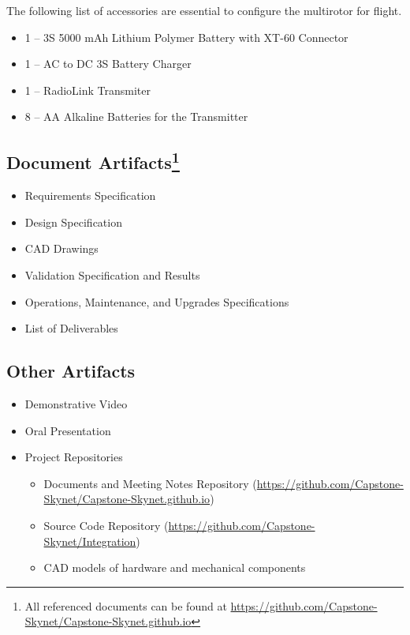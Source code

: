 \documentclass[10pt,letterpaper]{article}
\begin{document}
The following list of accessories are essential to configure the multirotor for flight.

\begin{itemize}
\item 1 -- 3S 5000 mAh Lithium Polymer Battery with XT-60 Connector
\item 1 -- AC to DC 3S Battery Charger
\item 1 -- RadioLink Transmiter
\item 8 -- AA Alkaline Batteries for the Transmitter
\end{itemize}


\subsection[Document Artifacts]{Document Artifacts\footnote{All referenced documents can be found at \url{https://github.com/Capstone-Skynet/Capstone-Skynet.github.io}}}

\begin{itemize}
\item Requirements Specification
\item Design Specification
\item CAD Drawings
\item Validation Specification and Results
\item Operations, Maintenance, and Upgrades Specifications
\item List of Deliverables
\end{itemize}

\subsection{Other Artifacts}
\begin{itemize}
\item Demonstrative Video
\item Oral Presentation
\item Project Repositories
\begin{itemize}
    \item Documents and Meeting Notes Repository ({\url{https://github.com/Capstone-Skynet/Capstone-Skynet.github.io}})
    \item Source Code Repository ({\url{https://github.com/Capstone-Skynet/Integration}})
    \item CAD models of hardware and mechanical components
\end{itemize}
\end{itemize}
\end{document}
